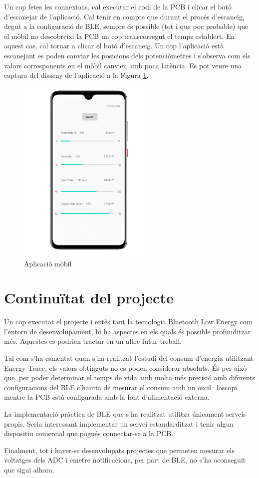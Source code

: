 Un cop fetes les connexions, cal executar el codi de la PCB i clicar el botó d'escanejar de l'aplicació.
Cal tenir en compte que durant el procés d'escaneig, degut a la configuració de BLE, sempre és possible (tot i que poc probable) que el mòbil no descobreixi la PCB un cop transcorregut el temps establert.
En aquest cas, cal tornar a clicar el botó d'escaneig.
Un cop l'aplicació està escanejant es poden canviar les posicions dels potenciòmetres i s'observa com els valors corresponents en el mòbil canvien amb poca latència.
Es pot veure una captura del disseny de l'aplicació a la Figura \ref{captura_app}.

\begin{figure}[h!]
	\begin{center}
		\includegraphics[width=0.6\textwidth]{./images/captura_app_borde.png}
		\caption{Aplicació mòbil}
		\label{captura_app}
	\end{center}
\end{figure}

\newpage
\section{Continuïtat del projecte}
Un cop executat el projecte i entès tant la tecnologia Bluetooth Low Energy com l'entorn de desenvolupament, hi ha aspectes en els quals és possible profunditzar més.
Aquestes es podrien tractar en un altre futur treball.

Tal com s'ha esmentat quan s'ha realitzat l'estudi del consum d'energia utilitzant Energy Trace, els valors obtinguts no es poden considerar absoluts.
És per això que, per poder determinar el temps de vida amb molta més precisió amb diferents configuracions del BLE s'hauria de mesurar el consum amb un oscil·loscopi mentre la PCB està configurada amb la font d'alimentació externa.

La implementació pràctica de BLE que s'ha realitzat utilitza únicament serveis propis.
Seria interessant implementar un servei estandarditzat i tenir algun dispositiu comercial que pogués connectar-se a la PCB.

Finalment, tot i haver-se desenvolupats projectes que permeten mesurar els voltatges dels ADC i emetre notificacions, per part de BLE, no s'ha aconseguit que sigui alhora.

